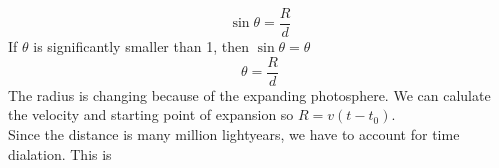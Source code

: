 \begin{equation}
    \sin{\theta} = \frac{R}{d}
\end{equation}
If $\theta$ is significantly smaller than 1, then $\sin{\theta} = \theta$
\begin{equation}
    \theta = \frac{R}{d}
\end{equation}
The radius is changing because of the expanding photosphere. We can calulate the velocity and starting point of expansion so $R = v(t-t_0)$.\\
Since the distance is many million lightyears, we have to account for time dialation. This is 